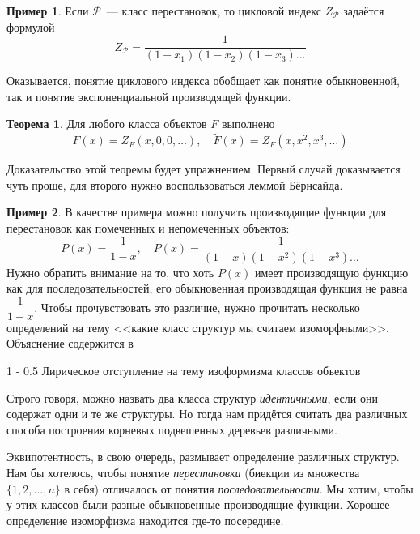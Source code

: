 \documentclass{article}
\makeatletter
\theoremstyle{definition}
\newtheorem{example}{Пример}
\newtheorem*{theorem}{Теорема}
\renewcommand{\subsection}{\@startsection
{subsection}%
{1}%
{\z@}%
{-\baselineskip}%
{0.5\baselineskip}%
{\centering\large\scshape}} %
\makeatother
\begin{document}
\begin{example}
	Если \( \mathcal P \)~--- класс перестановок, то цикловой индекс \( 
	Z_{\mathcal P} \) задаётся формулой
	\[
		Z_{\mathcal P} = \dfrac{1}{(1-x_1)(1-x_2)(1-x_3) \ldots}
	\]	
\end{example}

Оказывается, понятие циклового индекса обобщает как понятие обыкновенной, так и 
понятие экспоненциальной производящей функции.
\begin{theorem}
	Для любого класса объектов \( F \) выполнено
	\[
		F(x) = Z_F(x, 0, 0, \ldots), \quad
		\widetilde F(x) = Z_F(x, x^2, x^3, \ldots)
	\]
\end{theorem}

Доказательство этой теоремы будет упражнением. Первый случай доказывается чуть 
проще, для второго нужно воспользоваться леммой Бёрнсайда.

\begin{example}
	В качестве примера можно получить производящие функции для перестановок как 
	помеченных и непомеченных объектов:
	\[
		P(x) = \dfrac{1}{1 - x}, \quad
		\widetilde P(x) = \dfrac{1}{(1 - x)(1 - x^2)(1 - x^3) \ldots}
	\]
	Нужно обратить внимание на то, что хоть \( P(x) \) имеет производящую 
	функцию как для последовательностей, его обыкновенная производящая функция 
	не равна \( \dfrac{1}{1 - x} \). Чтобы прочувствовать это различие, нужно 
	прочитать несколько определений на тему <<какие класс структур мы считаем 
	изоморфными>>. Объяснение содержится в \cite[p. 20]{species}
\end{example}

\subsection{Лирическое отступление на тему изоформизма классов объектов}

Строго говоря, можно назвать два класса структур \textit{идентичными}, если они 
содержат одни и те же структуры. Но тогда нам придётся считать два различных 
способа построения корневых подвешенных деревьев различными.

Эквипотентность, в свою очередь, размывает определение различных структур. Нам 
бы хотелось, чтобы понятие \textit{перестановки} (биекции из множества \( 
\{1,2, \ldots, n\} \) в себя) отличалось от понятия 
\textit{последовательности}. Мы хотим, чтобы у этих классов были разные 
обыкновенные производящие функции. Хорошее определение изоморфизма находится 
где-то посередине.
\end{document}
